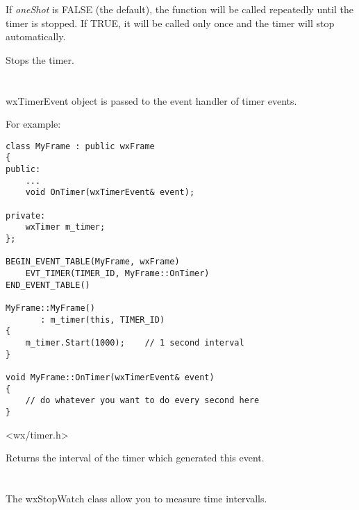 If {\it oneShot} is FALSE (the default), the  
function will be called repeatedly until the timer is stopped. If TRUE,
it will be called only once and the timer will stop automatically.



Stops the timer.

\section{}\label{wxtimerevent}

wxTimerEvent object is passed to the event handler of timer events.

For example:

\begin{verbatim}
class MyFrame : public wxFrame
{
public:
    ...
    void OnTimer(wxTimerEvent& event);

private:
    wxTimer m_timer;
};

BEGIN_EVENT_TABLE(MyFrame, wxFrame)
    EVT_TIMER(TIMER_ID, MyFrame::OnTimer)
END_EVENT_TABLE()

MyFrame::MyFrame()
       : m_timer(this, TIMER_ID)
{
    m_timer.Start(1000);    // 1 second interval
}

void MyFrame::OnTimer(wxTimerEvent& event)
{
    // do whatever you want to do every second here
}

\end{verbatim}


<wx/timer.h>






Returns the interval of the timer which generated this event.

\section{}\label{wxstopwatch}

The wxStopWatch class allow you to measure time intervalls. 

